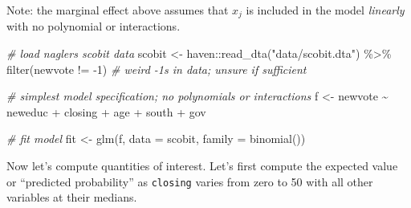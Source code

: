 \documentclass[
]{book}
\newenvironment{Shaded}{\begin{snugshade}}{\end{snugshade}}
\newcommand{\AttributeTok}[1]{\textcolor[rgb]{0.77,0.63,0.00}{#1}}
\newcommand{\CommentTok}[1]{\textcolor[rgb]{0.56,0.35,0.01}{\textit{#1}}}
\newcommand{\DecValTok}[1]{\textcolor[rgb]{0.00,0.00,0.81}{#1}}
\newcommand{\FunctionTok}[1]{\textcolor[rgb]{0.00,0.00,0.00}{#1}}
\newcommand{\NormalTok}[1]{#1}
\newcommand{\OtherTok}[1]{\textcolor[rgb]{0.56,0.35,0.01}{#1}}
\newcommand{\SpecialCharTok}[1]{\textcolor[rgb]{0.00,0.00,0.00}{#1}}
\newcommand{\StringTok}[1]{\textcolor[rgb]{0.31,0.60,0.02}{#1}}
\begin{document}
Note: the marginal effect above assumes that \(x_j\) is included in the model \emph{linearly} with no polynomial or interactions.

\begin{Shaded}
\begin{Highlighting}[]
\CommentTok{\# load nagler\textquotesingle{}s scobit data}
\NormalTok{scobit }\OtherTok{\textless{}{-}}\NormalTok{ haven}\SpecialCharTok{::}\FunctionTok{read\_dta}\NormalTok{(}\StringTok{"data/scobit.dta"}\NormalTok{) }\SpecialCharTok{\%\textgreater{}\%}
  \FunctionTok{filter}\NormalTok{(newvote }\SpecialCharTok{!=} \SpecialCharTok{{-}}\DecValTok{1}\NormalTok{)  }\CommentTok{\# weird {-}1s in data; unsure if sufficient}

\CommentTok{\# simplest model specification; no polynomials or interactions}
\NormalTok{f }\OtherTok{\textless{}{-}}\NormalTok{ newvote }\SpecialCharTok{\textasciitilde{}}\NormalTok{ neweduc }\SpecialCharTok{+}\NormalTok{ closing }\SpecialCharTok{+}\NormalTok{ age }\SpecialCharTok{+}\NormalTok{ south }\SpecialCharTok{+}\NormalTok{ gov}

\CommentTok{\# fit model}
\NormalTok{fit }\OtherTok{\textless{}{-}} \FunctionTok{glm}\NormalTok{(f, }\AttributeTok{data =}\NormalTok{ scobit, }\AttributeTok{family =} \FunctionTok{binomial}\NormalTok{())}
\end{Highlighting}
\end{Shaded}

Now let's compute quantities of interest. Let's first compute the expected value or ``predicted probability'' as \texttt{closing} varies from zero to 50 with all other variables at their medians.
\end{document}
